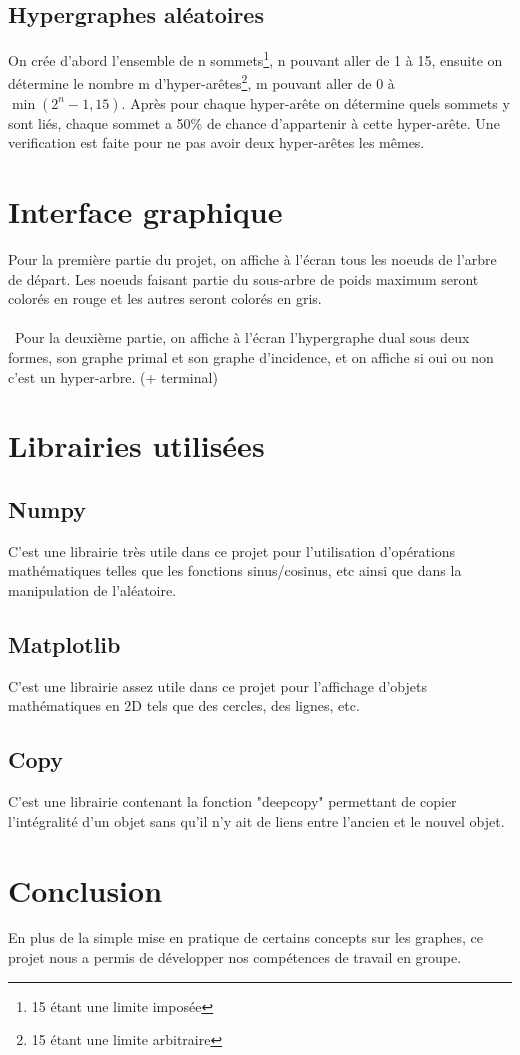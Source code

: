 \documentclass{article}
\begin{document}
	
	\subsection{Hypergraphes aléatoires}
	On crée d'abord l'ensemble de n sommets\footnote{15 étant une limite imposée}, n pouvant aller de 1 à 15, ensuite on détermine le nombre m d'hyper-arêtes\footnote{15 étant une limite arbitraire}, m pouvant aller de 0 à $\min(2^n-1,15)$. Après pour chaque hyper-arête on détermine quels sommets y sont liés, chaque sommet a 50\% de chance d'appartenir à cette hyper-arête. Une verification est faite pour ne pas avoir deux hyper-arêtes les mêmes.

\section{Interface graphique}
	Pour la première partie du projet, on affiche à l'écran tous les noeuds de l'arbre de départ. Les noeuds faisant partie du sous-arbre de poids maximum seront colorés en rouge et les autres seront colorés en gris.\\\ \\\ Pour la deuxième partie, on affiche à l'écran l'hypergraphe dual sous deux formes, son graphe primal et son graphe d'incidence, et on affiche si oui ou non c'est un hyper-arbre. (+ terminal)

\section{Librairies utilisées}

	\subsection{Numpy}
		C'est une librairie très utile dans ce projet pour l'utilisation d'opérations mathématiques telles que les fonctions sinus/cosinus, etc ainsi que dans la manipulation de l'aléatoire.

	\subsection{Matplotlib}
		C'est une librairie assez utile dans ce projet pour l'affichage d'objets mathématiques en 2D tels que des cercles, des lignes, etc.
	
	\subsection{Copy}
		C'est une librairie contenant la fonction "deepcopy" permettant de copier l'intégralité d'un objet sans qu'il n'y ait de liens entre l'ancien et le nouvel objet.

\section{Conclusion}
	En plus de la simple mise en pratique de certains concepts sur les graphes, ce projet nous a permis de développer nos compétences de travail en groupe.
\end{document}
